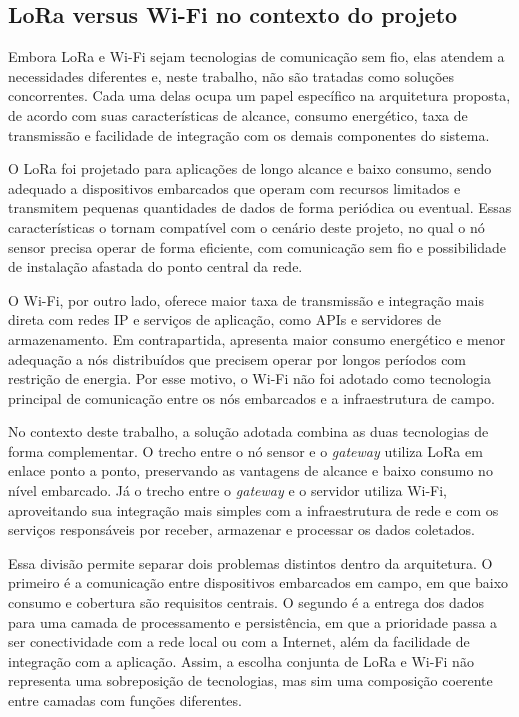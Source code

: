 \subsection{LoRa versus Wi-Fi no contexto do projeto}

Embora LoRa e Wi-Fi sejam tecnologias de comunicação sem fio, elas atendem a necessidades diferentes e, neste trabalho, não são tratadas como soluções concorrentes. Cada uma delas ocupa um papel específico na arquitetura proposta, de acordo com suas características de alcance, consumo energético, taxa de transmissão e facilidade de integração com os demais componentes do sistema.

O LoRa foi projetado para aplicações de longo alcance e baixo consumo, sendo adequado a dispositivos embarcados que operam com recursos limitados e transmitem pequenas quantidades de dados de forma periódica ou eventual. Essas características o tornam compatível com o cenário deste projeto, no qual o nó sensor precisa operar de forma eficiente, com comunicação sem fio e possibilidade de instalação afastada do ponto central da rede.

O Wi-Fi, por outro lado, oferece maior taxa de transmissão e integração mais direta com redes IP e serviços de aplicação, como APIs e servidores de armazenamento. Em contrapartida, apresenta maior consumo energético e menor adequação a nós distribuídos que precisem operar por longos períodos com restrição de energia. Por esse motivo, o Wi-Fi não foi adotado como tecnologia principal de comunicação entre os nós embarcados e a infraestrutura de campo.

No contexto deste trabalho, a solução adotada combina as duas tecnologias de forma complementar. O trecho entre o nó sensor e o \textit{gateway} utiliza LoRa em enlace ponto a ponto, preservando as vantagens de alcance e baixo consumo no nível embarcado. Já o trecho entre o \textit{gateway} e o servidor utiliza Wi-Fi, aproveitando sua integração mais simples com a infraestrutura de rede e com os serviços responsáveis por receber, armazenar e processar os dados coletados.

Essa divisão permite separar dois problemas distintos dentro da arquitetura. O primeiro é a comunicação entre dispositivos embarcados em campo, em que baixo consumo e cobertura são requisitos centrais. O segundo é a entrega dos dados para uma camada de processamento e persistência, em que a prioridade passa a ser conectividade com a rede local ou com a Internet, além da facilidade de integração com a aplicação. Assim, a escolha conjunta de LoRa e Wi-Fi não representa uma sobreposição de tecnologias, mas sim uma composição coerente entre camadas com funções diferentes.

